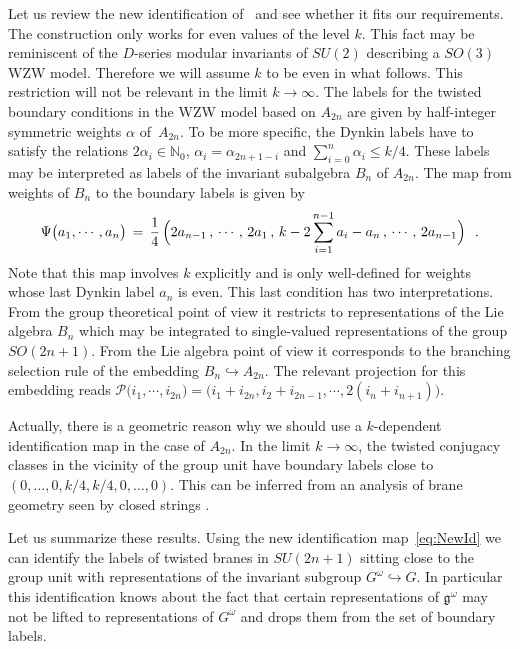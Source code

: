 \documentclass[12pt,a4paper]{article}
\newcommand{\Natural}{\mathbb{N}}
\newcommand{\mf}{\mathfrak} %
\newcommand{\mc}{\mathcal} %
\def\Iso{\Psi}
\def\iG{G^\omega} %
\def\ig{\mf{g}^\omega} %
\begin{document}
\begin{appendix}
  Let us review the new identification of~\cite{Quella:2001wh} and see
  whether it fits our requirements. The construction only works for even
  values of the level $k$. This fact may be reminiscent of the $D$-series
  modular invariants of $SU(2)$ describing a $SO(3)$ WZW model. Therefore
  we will assume $k$ to be even in what follows. This restriction will not
  be relevant in the limit $k\to\infty$. The labels for the
  twisted boundary conditions in the WZW model based on $A_{2n}$ are given by
  half-integer symmetric weights $\alpha$ of~$A_{2n}$. To be more specific, the
  Dynkin labels have to satisfy the relations $2\alpha_i\in\Natural_0$,
  $\alpha_i=\alpha_{2n+1-i}$ and $\sum_{i=0}^n\alpha_i\leq k/4$. These
  labels may be interpreted as labels of the invariant subalgebra $B_n$
  of $A_{2n}$. The map from weights of $B_n$ to
  the boundary labels is given by~\cite{Quella:2001wh}
\begin{equation}
  \label{eq:NewId}
  \Iso\bigl(a_1,\cdots,a_n\bigr)
  \,=\,\frac{1}{4}\,\Bigl(2a_{n-1}\,,\,\cdots,\,2a_1\,,\,k-2\sum_{i=1}^{n-1}a_i-a_n\,,\,\cdots,\,2a_{n-1}\Bigr)\ \ .
\end{equation}
  Note that this map involves $k$ explicitly and is only well-defined for
  weights whose last Dynkin label $a_n$ is even. This last condition 
  has two interpretations.
  From the group theoretical point of view it restricts to representations
  of the Lie algebra $B_n$ which may be integrated to single-valued
  representations of the group $SO(2n+1)$. From the Lie algebra point of view
  it corresponds to the
  branching selection rule of the embedding $B_n\hookrightarrow A_{2n}$.
  The relevant projection for this embedding reads
  $\mc{P}\bigl(i_1,\cdots,i_{2n}\bigr)
   =\bigl(i_1+i_{2n},i_2+i_{2n-1},\cdots,2(i_n+i_{n+1})\bigr)$.
  
Actually, there is a geometric reason why we should use a
$k$-dependent identification map in the case of $A_{2n}$. 
In the limit $k\to \infty $, the
twisted conjugacy classes in the vicinity of 
the group unit have boundary labels
close to $(0,\dots,0 ,k/4,k/4,0,\dots ,0)$. This can be inferred from
an analysis of brane geometry seen by closed strings \cite{Felder:1999ka}.

Let us summarize these results.
  Using the new identification map~\eqref{eq:NewId} we 
can identify the labels of twisted branes in $SU (2n+1)$
sitting close to the group unit
  with representations of the invariant subgroup $\iG\hookrightarrow G$.
  In particular this identification knows about the fact that
  certain representations of $\ig$ may not be lifted to representations of
  $\iG$ and drops them from the set of boundary labels.
  

\end{appendix}
\end{document}
